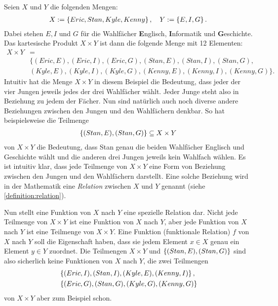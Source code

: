 {
Seien $X$ und $Y$ die folgenden Mengen:
\begin{align*}
    X := \left\{Eric, Stan, Kyle, Kenny\right\}, \quad Y := \left\{E, I, G\right\}.
\end{align*}
Dabei stehen $E, I$ und $G$ für die Wahlfächer \textbf{E}nglisch, \textbf{I}nformatik und \textbf{G}eschichte.
Das kartesische Produkt $X\times Y$ ist dann die folgende Menge mit 12 Elementen:
\begin{equation*}
    \begin{split}
    X\times Y &= \\
    &\{ (Eric, E),(Eric, I),(Eric, G),(Stan, E),(Stan, I),(Stan, G),\\
    &(Kyle, E),(Kyle, I),(Kyle, G),(Kenny, E),(Kenny, I),(Kenny, G) \}.
    \end{split}
\end{equation*}
Intuitiv hat die Menge $X\times Y$ in diesem Beispiel die Bedeutung, dass jeder der vier Jungen jeweils jedes der drei Wahlfächer wählt. Jeder Junge steht also in Beziehung zu jedem der Fächer. Nun sind natürlich auch noch diverse andere Beziehungen zwischen den Jungen und den Wahlfächern denkbar. So hat beispielsweise die Teilmenge
\begin{align*}
    \left\{(Stan, E), (Stan, G)\right\} \subseteq X\times Y
\end{align*}
von $X\times Y$ die Bedeutung, dass Stan genau die beiden Wahlfächer Englisch und Geschichte wählt und die anderen drei Jungen jeweils kein Wahlfach wählen. Es ist intuitiv klar, dass jede Teilmenge von $X\times Y$ eine Form von Beziehung zwischen den Jungen und den Wahlfächern darstellt. Eine solche Beziehung wird in der Mathematik eine \textit{Relation} zwischen $X$ und $Y$ genannt (siehe \cref{definition:relation}). 

Nun stellt eine Funktion von $X$ nach $Y$ eine spezielle Relation dar. Nicht jede Teilmenge von $X\times Y$ ist eine Funktion von $X$ nach $Y$, aber jede Funktion von $X$ nach $Y$ ist eine Teilmenge von $X\times Y$. Eine Funktion (funktionale Relation) $f$ von $X$ nach $Y$ soll die Eigenschaft haben, dass sie jedem Element $x\in X$ genau ein Element $y\in Y$ zuordnet. Die Teilmengen $X\times Y$ und $\left\{(Stan, E), (Stan, G)\right\}$ sind also sicherlich keine Funktionen von $X$ nach $Y$, die zwei Teilmengen
\begin{align*}
    &\left\{(Eric, I), (Stan, I), (Kyle, E), (Kenny, I)\right\}, \\
    &\left\{(Eric, G), (Stan, G), (Kyle, G), (Kenny, G)\right\}
\end{align*}
von $X\times Y$ aber zum Beispiel schon.

}

